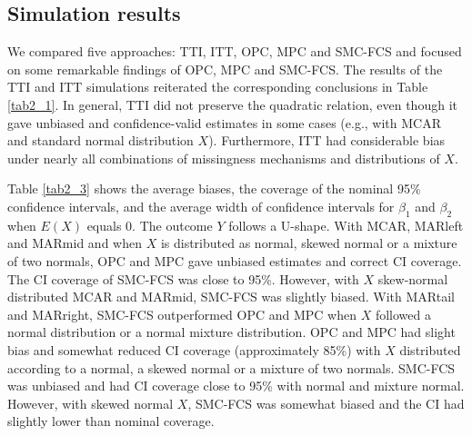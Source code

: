 	\subsection{Simulation results}
	We compared five approaches: TTI, ITT, OPC, MPC and SMC-FCS and focused on some remarkable findings of OPC, MPC and SMC-FCS. The results of the TTI and ITT simulations reiterated the corresponding conclusions in Table \ref{tab2_1}. In general, TTI did not preserve the quadratic relation, even though it gave unbiased and confidence-valid estimates in some cases (e.g., with MCAR and standard normal distribution $X$). Furthermore, ITT had considerable bias under nearly all combinations of missingness mechanisms and distributions of $X$. 
	
	
	Table \ref{tab2_3} shows the average biases, the coverage of the nominal 95\% confidence intervals, and the average width of confidence intervals for $\beta_1$ and $\beta_2$ when $E(X)$ equals 0. The outcome $Y$ follows a U-shape. With MCAR, MARleft and MARmid and when $X$ is distributed as normal, skewed normal or a mixture of two normals, OPC and MPC gave unbiased estimates and correct CI coverage. The CI coverage of SMC-FCS was close to 95\%. However, with $X$ skew-normal distributed MCAR and MARmid, SMC-FCS was slightly biased. With MARtail and MARright, SMC-FCS outperformed OPC and MPC when $X$ followed a normal distribution or a normal mixture distribution. OPC and MPC had slight bias and somewhat reduced CI coverage (approximately 85\%) with $X$ distributed according to a normal, a skewed normal or a mixture of two normals. SMC-FCS was unbiased and had CI coverage close to 95\% with normal and mixture normal. However, with skewed normal $X$, SMC-FCS was somewhat biased and the CI had slightly lower than nominal coverage.
	
